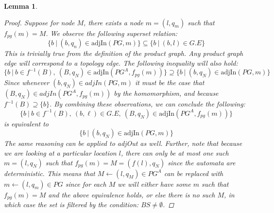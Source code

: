 \documentclass[twocolumn, openany]{sig-alternate-10pt}
\newtheorem{lem}[thm]{Lemma}
\begin{document}
\begin{lem}
\begin{proof}
    Suppose for node $M$, there exists a node $m=(l,q_m)$ such that $f_{pg}(m) = M$. 
    We observe the following superset relation:
    $$\{ b ~\vert~ (b,q_n) \in \text{adjIn}(PG,m)\} \subseteq \{ b ~\vert~ (b,l) \in G.E \}$$
    This is trivially true from the definition of the product graph. Any product graph edge will correspond to a topology edge. The following inequality will also hold:
    $$\{b ~\vert~ b \in f^{-1}(B),~ (B,q_N) \in \text{adjIn}(PG^A,f_{pg}(m)) \} \supseteq \{ b ~\vert~ (b,q_N) \in \text{adjIn}(PG,m)\}$$
    Since whenever $(b,q_N) \in adjIn(PG,m)$ it must be the case that $(B,q_N) \in adjIn(PG^A, f_{pg}(m))$ by the homomorphism, and because $f^{-1}(B) \supseteq \{ b \}$. By combining these observations, we can conclude the following:
    $$\{b ~\vert~ b \in f^{-1}(B),~ (b,\ell) \in G.E,~ (B,q_N) \in \text{adjIn}(PG^A,f_{pg}(m)) \}$$
    is equivalent to
    $$\{ b ~\vert~ (b,q_N) \in \text{adjIn}(PG,m)\}$$
    The same reasoning can be applied to adjOut as well. 
    Further, note that because we are looking at a particular location $l$, there can only be at most one such $m = (l,q_N)$ such that $f_{pg}(m) = M = (f(l), q_N)$ since the automata are deterministic. 
    This means that $M \leftarrow (l,q_M) \in PG^A$ can be replaced with $m \leftarrow (l,q_m) \in PG$ since for each $M$ we will either have some $m$ such that $f_{pg}(m) = M$ and the above equivalence holds, or else there is no such $M$, in which case the set is filtered by the condition: $BS \neq \emptyset$.

  \end{proof}


\end{lem}
\end{document}
